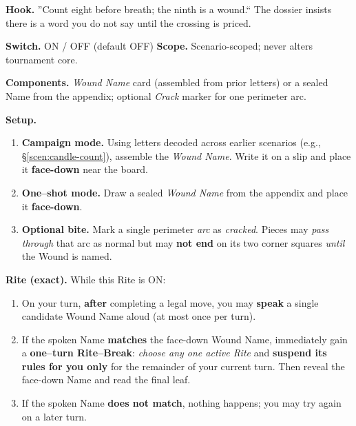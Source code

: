 \documentclass[11pt]{article}
\numberwithin{equation}{section} %
\theoremstyle{plain} %
\theoremstyle{definition} %
\theoremstyle{remark} %
\begin{document}
\noindent\textbf{Hook.} ''Count eight before breath; the ninth is a wound.`` The dossier insists there is a word you do not say until the crossing is priced.

\medskip
\noindent\textbf{Switch.} \textsc{ON / OFF} (default \textsc{OFF}) \hfill \textbf{Scope.} Scenario-scoped; never alters tournament core.

\medskip
\noindent\textbf{Components.} \emph{Wound Name} card (assembled from prior letters) or a sealed Name from the appendix; optional \emph{Crack} marker for one perimeter arc.

\medskip
\noindent\textbf{Setup.}
\begin{enumerate}\setlength\itemsep{0.2em}
  \item \textbf{Campaign mode.} Using letters decoded across earlier scenarios (e.g., \S\ref{scen:candle-count}), assemble the \emph{Wound Name}. Write it on a slip and place it \textbf{face-down} near the board.
  \item \textbf{One--shot mode.} Draw a sealed \emph{Wound Name} from the appendix and place it \textbf{face-down}.
  \item \textbf{Optional bite.} Mark a single perimeter \emph{arc} as \emph{cracked}. Pieces may \emph{pass through} that arc as normal but may \textbf{not end} on its two corner squares \textit{until} the Wound is named.
\end{enumerate}

\medskip
\noindent\textbf{Rite (exact).} While this Rite is \textsc{ON}:
\begin{enumerate}\setlength\itemsep{0.2em}
  \item On your turn, \textbf{after} completing a legal move, you may \textbf{speak} a single candidate Wound Name aloud (at most once per turn).
  \item If the spoken Name \textbf{matches} the face-down Wound Name, immediately gain a \textbf{one--turn Rite--Break}: \emph{choose any one active Rite} and \textbf{suspend its rules for you only} for the remainder of your current turn. Then reveal the face-down Name and read the final leaf.
  \item If the spoken Name \textbf{does not match}, nothing happens; you may try again on a later turn.
\end{enumerate}
\end{document}

